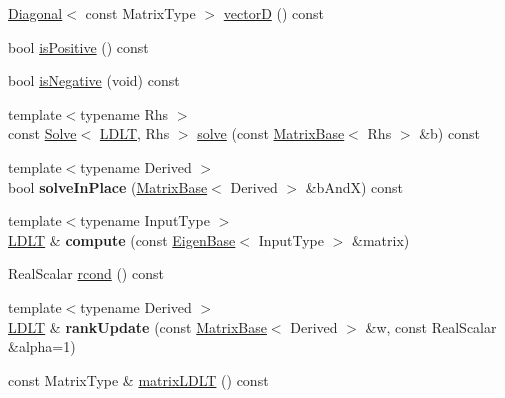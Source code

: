 \begin{DoxyCompactItemize}
\item 
\mbox{\hyperlink{class_eigen_1_1_diagonal}{Diagonal}}$<$ const Matrix\+Type $>$ \mbox{\hyperlink{class_eigen_1_1_l_d_l_t_af60b2f826a38a00070e0efccf0572066}{vectorD}} () const
\item 
bool \mbox{\hyperlink{class_eigen_1_1_l_d_l_t_a5e1c6b7ba8d7b82575d6ffdc3bf35bcb}{is\+Positive}} () const
\item 
bool \mbox{\hyperlink{class_eigen_1_1_l_d_l_t_aabd3e7aebe844034caca4c62dbe9c1eb}{is\+Negative}} (void) const
\item 
{\footnotesize template$<$typename Rhs $>$ }\\const \mbox{\hyperlink{class_eigen_1_1_solve}{Solve}}$<$ \mbox{\hyperlink{class_eigen_1_1_l_d_l_t}{L\+D\+LT}}, Rhs $>$ \mbox{\hyperlink{class_eigen_1_1_l_d_l_t_aa257dd7a8acf8b347d5a22a13d6ca3e1}{solve}} (const \mbox{\hyperlink{class_eigen_1_1_matrix_base}{Matrix\+Base}}$<$ Rhs $>$ \&b) const
\item 
\mbox{\label{class_eigen_1_1_l_d_l_t_a56c31a5716aa8369f9bbc1a93b2020c3}} 
{\footnotesize template$<$typename Derived $>$ }\\bool {\bfseries solve\+In\+Place} (\mbox{\hyperlink{class_eigen_1_1_matrix_base}{Matrix\+Base}}$<$ Derived $>$ \&b\+AndX) const
\item 
\mbox{\label{class_eigen_1_1_l_d_l_t_aef70371f07bf006a85250bfaeed2f992}} 
{\footnotesize template$<$typename Input\+Type $>$ }\\\mbox{\hyperlink{class_eigen_1_1_l_d_l_t}{L\+D\+LT}} \& {\bfseries compute} (const \mbox{\hyperlink{struct_eigen_1_1_eigen_base}{Eigen\+Base}}$<$ Input\+Type $>$ \&matrix)
\item 
Real\+Scalar \mbox{\hyperlink{class_eigen_1_1_l_d_l_t_ae646403fdde3a4b18e278a32c61a0953}{rcond}} () const
\item 
\mbox{\label{class_eigen_1_1_l_d_l_t_a1bdbfbf648360fdb49b8f88cf78b0558}} 
{\footnotesize template$<$typename Derived $>$ }\\\mbox{\hyperlink{class_eigen_1_1_l_d_l_t}{L\+D\+LT}} \& {\bfseries rank\+Update} (const \mbox{\hyperlink{class_eigen_1_1_matrix_base}{Matrix\+Base}}$<$ Derived $>$ \&w, const Real\+Scalar \&alpha=1)
\item 
const Matrix\+Type \& \mbox{\hyperlink{class_eigen_1_1_l_d_l_t_aa5e0fd09dcd5251a8521fa248b95db0b}{matrix\+L\+D\+LT}} () const

\end{DoxyCompactItemize}
